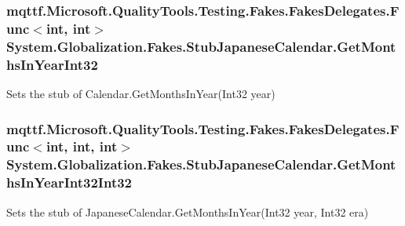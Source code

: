 \hypertarget{class_system_1_1_globalization_1_1_fakes_1_1_stub_japanese_calendar_aeda163c4724ac21e7b1f2f9bf606b582}{
\subsubsection[{Get\-Months\-In\-Year\-Int32}]{\setlength{\rightskip}{0pt plus 5cm}mqttf.\-Microsoft.\-Quality\-Tools.\-Testing.\-Fakes.\-Fakes\-Delegates.\-Func$<$int, int$>$ System.\-Globalization.\-Fakes.\-Stub\-Japanese\-Calendar.\-Get\-Months\-In\-Year\-Int32}}\label{class_system_1_1_globalization_1_1_fakes_1_1_stub_japanese_calendar_aeda163c4724ac21e7b1f2f9bf606b582}


Sets the stub of Calendar.\-Get\-Months\-In\-Year(\-Int32 year)

\hypertarget{class_system_1_1_globalization_1_1_fakes_1_1_stub_japanese_calendar_ad38dac0320f4cca61a08cc2a2ccbb4b7}{
\subsubsection[{Get\-Months\-In\-Year\-Int32\-Int32}]{\setlength{\rightskip}{0pt plus 5cm}mqttf.\-Microsoft.\-Quality\-Tools.\-Testing.\-Fakes.\-Fakes\-Delegates.\-Func$<$int, int, int$>$ System.\-Globalization.\-Fakes.\-Stub\-Japanese\-Calendar.\-Get\-Months\-In\-Year\-Int32\-Int32}}\label{class_system_1_1_globalization_1_1_fakes_1_1_stub_japanese_calendar_ad38dac0320f4cca61a08cc2a2ccbb4b7}


Sets the stub of Japanese\-Calendar.\-Get\-Months\-In\-Year(\-Int32 year, Int32 era)

